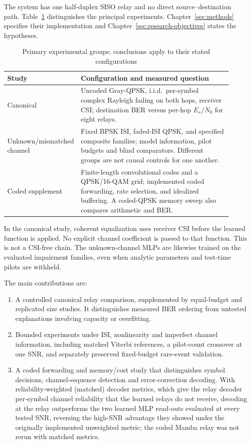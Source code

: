 The system has one half-duplex SISO relay and no direct source--destination path. Table~\ref{tbl:scope} distinguishes the principal experiments. Chapter~\ref{sec:methods} specifies their implementation and Chapter~\ref{sec:research-objectives} states the hypotheses.

\begin{longtable}{@{}p{0.24\linewidth}p{0.68\linewidth}@{}}
\caption[Scope of the thesis]{Primary experimental groups; conclusions apply to their stated configurations}\label{tbl:scope}\\
\toprule
Study & Configuration and measured question\\
\midrule
Canonical & Uncoded Gray-QPSK, i.i.d.\ per-symbol complex Rayleigh fading on both hops, receiver CSI; destination BER versus per-hop $E_s/N_0$ for eight relays.\\
Unknown/mismatched channel & Fixed BPSK ISI, faded-ISI QPSK, and specified composite families; model information, pilot budgets and blind comparators. Different groups are not causal controls for one another.\\
Coded supplement & Finite-length convolutional codes and a QPSK/16-QAM grid; implemented coded forwarding, rate selection, and idealized buffering. A coded-QPSK memory sweep also compares arithmetic and BER.\\
\bottomrule
\end{longtable}

In the canonical study, coherent equalization uses receiver CSI before the learned function is applied. No explicit channel coefficient is passed to that function. This is not a CSI-free chain. The unknown-channel MLPs are likewise trained on the evaluated impairment families, even when analytic parameters and test-time pilots are withheld.

The main contributions are:
\begin{enumerate}
\item A controlled canonical relay comparison, supplemented by equal-budget and replicated size studies. It distinguishes measured BER ordering from untested explanations involving capacity or overfitting.
\item Bounded experiments under ISI, nonlinearity and imperfect channel information, including matched Viterbi references, a pilot-count crossover at one SNR, and separately preserved fixed-budget rare-event validation.
\item A coded forwarding and memory/cost study that distinguishes symbol decisions, channel-sequence detection and error-correction decoding. With reliability-weighted (matched) decoder metrics, which give the relay decoder per-symbol channel reliability that the learned relays do not receive, decoding at the relay outperforms the two learned MLP read-outs evaluated at every tested SNR, reversing the high-SNR advantage they showed under the originally implemented unweighted metric; the coded Mamba relay was not rerun with matched metrics.
\end{enumerate}

